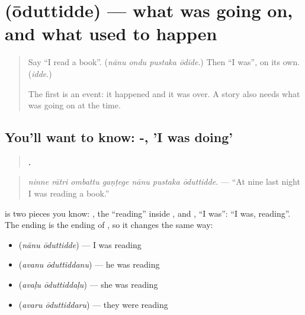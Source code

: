 \section[\texorpdfstring{\kn{ಓದುತ್ತಿದ್ದೆ} (ōduttidde)}{ಓದುತ್ತಿದ್ದೆ (ōduttidde)}]{ (ōduttidde) — what was going on, and what used to happen}

\label{lesson:KA-C309-oduttidde}



\begin{quote}
Say \textquotedblleft{}I read a book\textquotedblright{}. (\emph{nānu ondu pustaka ōdide}.) Then \textquotedblleft{}I was\textquotedblright{}, on its own. (\emph{idde}.)

The first is an event: it happened and it was over. A story also needs what was going on at the time.
\end{quote}

\subsection*{You'll want to know: -, 'I was doing'}
\begin{quote}
\textbf{      .}
\end{quote}

\begin{quote}
\emph{ninne rātri ombattu gaṇṭege nānu pustaka ōduttidde.} — \textquotedblleft{}At nine last night I was reading a book.\textquotedblright{}
\end{quote}

\textbf{} is two pieces you know: \textbf{}, the \textquotedblleft{}reading\textquotedblright{} inside \textbf{}, and \textbf{}, \textquotedblleft{}I was\textquotedblright{}: \textquotedblleft{}I was, reading\textquotedblright{}. The ending is the ending of \textbf{}, so it changes the same way:

\begin{itemize}
\raggedright
  \item \textbf{ } (\emph{nānu ōduttidde}) — I was reading
  \item \textbf{ } (\emph{avanu ōduttiddanu}) — he was reading
  \item \textbf{ } (\emph{avaḷu ōduttiddaḷu}) — she was reading
  \item \textbf{ } (\emph{avaru ōduttiddaru}) — they were reading
\end{itemize}

